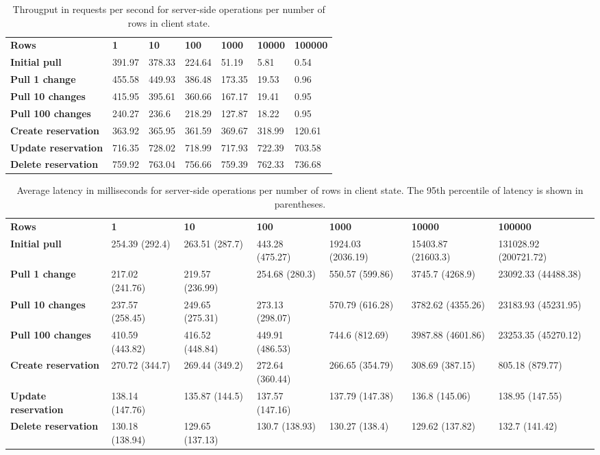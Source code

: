 
\begin{table}[H]
\centering
\begin{tabular}{lllllll}
\textbf{Rows} & \textbf{1} & \textbf{10} & \textbf{100} & \textbf{1000} & \textbf{10000} & \textbf{100000} \\
\textbf{Initial pull} & 391.97 & 378.33 & 224.64 & 51.19 & 5.81 & 0.54\\
\textbf{Pull 1 change} & 455.58 & 449.93 & 386.48 & 173.35 & 19.53 & 0.96\\
\textbf{Pull 10 changes} & 415.95 & 395.61 & 360.66 & 167.17 & 19.41 & 0.95\\
\textbf{Pull 100 changes} & 240.27 & 236.6 & 218.29 & 127.87 & 18.22 & 0.95\\
\textbf{Create reservation} & 363.92 & 365.95 & 361.59 & 369.67 & 318.99 & 120.61\\
\textbf{Update reservation} & 716.35 & 728.02 & 718.99 & 717.93 & 722.39 & 703.58\\
\textbf{Delete reservation} & 759.92 & 763.04 & 756.66 & 759.39 & 762.33 & 736.68
\end{tabular}
\caption{Througput in requests per second for server-side operations per number of rows in client state.}
\label{tab:server-relic-experiment}
\end{table}

\begin{table}[H]
\centering
\begin{adjustbox}{width=\textwidth}
\begin{tabular}{lllllll}
\textbf{Rows} & \textbf{1} & \textbf{10} & \textbf{100} & \textbf{1000} & \textbf{10000} & \textbf{100000} \\
\textbf{Initial pull} & 254.39 (292.4) & 263.51 (287.7) & 443.28 (475.27) & 1924.03 (2036.19) & 15403.87 (21603.3) & 131028.92 (200721.72)\\
\textbf{Pull 1 change} & 217.02 (241.76) & 219.57 (236.99) & 254.68 (280.3) & 550.57 (599.86) & 3745.7 (4268.9) & 23092.33 (44488.38)\\
\textbf{Pull 10 changes} & 237.57 (258.45) & 249.65 (275.31) & 273.13 (298.07) & 570.79 (616.28) & 3782.62 (4355.26) & 23183.93 (45231.95)\\
\textbf{Pull 100 changes} & 410.59 (443.82) & 416.52 (448.84) & 449.91 (486.53) & 744.6 (812.69) & 3987.88 (4601.86) & 23253.35 (45270.12)\\
\textbf{Create reservation} & 270.72 (344.7) & 269.44 (349.2) & 272.64 (360.44) & 266.65 (354.79) & 308.69 (387.15) & 805.18 (879.77)\\
\textbf{Update reservation} & 138.14 (147.76) & 135.87 (144.5) & 137.57 (147.16) & 137.79 (147.38) & 136.8 (145.06) & 138.95 (147.55)\\
\textbf{Delete reservation} & 130.18 (138.94) & 129.65 (137.13) & 130.7 (138.93) & 130.27 (138.4) & 129.62 (137.82) & 132.7 (141.42)
\end{tabular}
\end{adjustbox}
\caption{Average latency in milliseconds for server-side operations per number of rows in client state. The 95th percentile of latency is shown in parentheses.}
\label{tab:server-relic-experiment-latency}
\end{table}

